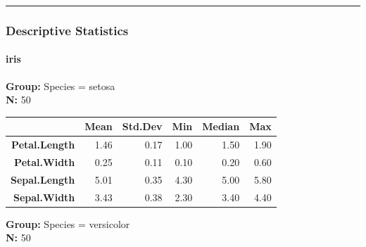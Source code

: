 \documentclass[]{article}
\newenvironment{Shaded}{\begin{snugshade}}{\end{snugshade}}
\newcommand{\CommentTok}[1]{\textcolor[rgb]{0.56,0.35,0.01}{\textit{#1}}}
\newcommand{\DataTypeTok}[1]{\textcolor[rgb]{0.13,0.29,0.53}{#1}}
\newcommand{\KeywordTok}[1]{\textcolor[rgb]{0.13,0.29,0.53}{\textbf{#1}}}
\newcommand{\NormalTok}[1]{#1}
\newcommand{\OperatorTok}[1]{\textcolor[rgb]{0.81,0.36,0.00}{\textbf{#1}}}
\newcommand{\OtherTok}[1]{\textcolor[rgb]{0.56,0.35,0.01}{#1}}
\newcommand{\StringTok}[1]{\textcolor[rgb]{0.31,0.60,0.02}{#1}}
\let\oldparagraph\paragraph
\renewcommand{\paragraph}[1]{\oldparagraph{#1}\mbox{}}
\begin{document}
\begin{center}\rule{0.5\linewidth}{\linethickness}\end{center}

\begin{Shaded}
\end{Shaded}

\hypertarget{descriptive-statistics-1}{%
\subsubsection{Descriptive Statistics}\label{descriptive-statistics-1}}

\hypertarget{iris-1}{%
\paragraph{iris}\label{iris-1}}

\textbf{Group:} Species = setosa\\
\textbf{N:} 50

\begin{longtable}[]{@{}rrrrrr@{}}
\toprule
~ & Mean & Std.Dev & Min & Median & Max\tabularnewline
\midrule
\endhead
\textbf{Petal.Length} & 1.46 & 0.17 & 1.00 & 1.50 & 1.90\tabularnewline
\textbf{Petal.Width} & 0.25 & 0.11 & 0.10 & 0.20 & 0.60\tabularnewline
\textbf{Sepal.Length} & 5.01 & 0.35 & 4.30 & 5.00 & 5.80\tabularnewline
\textbf{Sepal.Width} & 3.43 & 0.38 & 2.30 & 3.40 & 4.40\tabularnewline
\bottomrule
\end{longtable}

\textbf{Group:} Species = versicolor\\
\textbf{N:} 50
\end{document}
